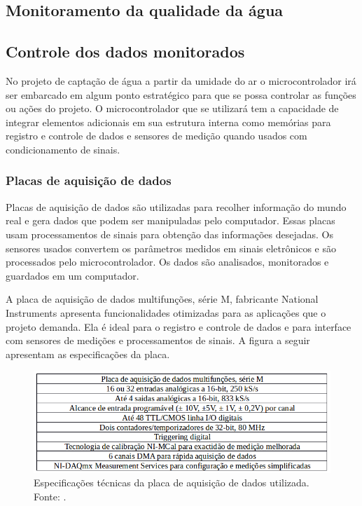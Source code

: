       
      
      
      
    \subsection{Monitoramento da qualidade da água}
    
      
      
      
    
    \subsection{Controle dos dados monitorados}
    
      No projeto de captação de água a partir da umidade do ar o microcontrolador irá ser embarcado em algum ponto estratégico para que se possa controlar as funções ou ações do projeto. O microcontrolador que se utilizará tem a capacidade de integrar elementos adicionais em sua estrutura interna como memórias para registro e controle de dados e sensores de medição quando usados com condicionamento de sinais.
      
      \subsubsection{Placas de aquisição de dados}
      
	Placas de aquisição de dados são utilizadas para recolher informação do mundo real e gera dados que podem ser manipuladas pelo computador. Essas placas usam processamentos de sinais para obtenção das informações desejadas. Os sensores usados convertem os parâmetros medidos em sinais eletrônicos e são processados pelo microcontrolador. Os dados são analisados, monitorados e guardados em um computador. 
	
	A placa de aquisição de dados multifunções, série M, fabricante National Instruments apresenta funcionalidades otimizadas para as aplicações que o projeto demanda. Ela é ideal para o registro e controle de dados e para interface com sensores de medições e processamentos de sinais. A figura a seguir apresentam as especificações da placa.
	
	\begin{figure}[!ht]
	  \centering
	  \includegraphics[scale=0.6]{editaveis/figuras/placa_aquisicao_spec}
	  \caption[Especificações técnicas da placa de aquisição de dados utilizada]
	      {Especificações técnicas da placa de aquisição de dados utilizada. Fonte: \cite{national04}.}
	\label{placa_aquisicao_spec}
	\end{figure}
	
